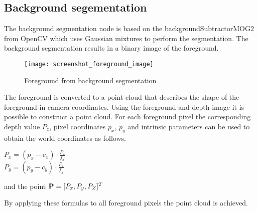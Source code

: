 \subsection{Background segementation}

The background segmentation node is based on the backgroundSubtractorMOG2 from OpenCV \cite{BGS} which uses Gaussian mixtures to perform the segmentation. The background segmentation results in a binary image of the foreground. 

\begin{figure}[H]
\begin{center}
\texttt{[image: screenshot\_foreground\_image]}
\caption{Foreground from background segmentation}

\end{center}
\end{figure}

The foreground is converted to a point cloud that describes the shape of the foreground in camera coordinates. Using the foreground and depth image it is possible to construct a point cloud. For each foreground pixel the corresponding depth value $P_z$, pixel coordinates $p_x$, $p_y$ and intrinsic parameters can be used to obtain the world coordinates as follows.
\begin{center}
$\displaystyle P_x = (p_x - c_x) \cdot \frac{P_z}{f_x}$\\ \vspace{10 pt}
$\displaystyle P_y = (p_y - c_y) \cdot \frac{P_z}{f_y}$
\end{center}
and the point ${\bf P} = [P_x, P_y, P_Z]^T$

By applying these formulas to all foreground pixels the point cloud is achieved.


